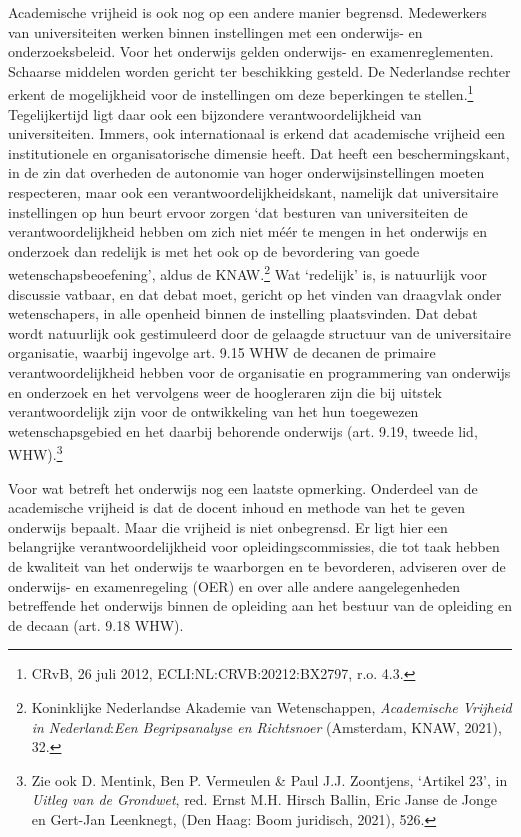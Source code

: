 \documentclass[smallauthor, chapterhaspagenum, nochapterinheader, pagenuminheader,  bigchapnum,medium2, tocpages,  garamond, titleinheader]{jote-book}
\begin{document}
	Academische vrijheid is ook nog op een andere manier begrensd. Medewerkers van universiteiten werken binnen instellingen met een onderwijs- en onderzoeksbeleid. Voor het onderwijs gelden onderwijs- en examenreglementen. Schaarse middelen worden gericht ter beschikking gesteld. De Nederlandse rechter erkent de mogelijkheid voor de instellingen om deze beperkingen te stellen.\footnote{CRvB, 26 juli 2012, ECLI:NL:CRVB:20212:BX2797, r.o. 4.3.} Tegelijkertijd ligt daar ook een bijzondere verantwoordelijkheid van universiteiten. Immers, ook internationaal is erkend dat academische vrijheid een institutionele en organisatorische dimensie heeft. Dat heeft een beschermingskant, in de zin dat overheden de autonomie van hoger onderwijsinstellingen moeten respecteren, maar ook een verantwoordelijkheidskant, namelijk dat universitaire instellingen op hun beurt ervoor zorgen ‘dat besturen van universiteiten de verantwoordelijkheid hebben om zich niet méér te mengen in het onderwijs en onderzoek dan redelijk is met het ook op de bevordering van goede wetenschapsbeoefening', aldus de KNAW.\footnote{Koninklijke Nederlandse Akademie van Wetenschappen, \emph{Academische Vrijheid in }\emph{Nederland}:\emph{Een}\emph{ Begripsanalyse en Richtsnoer}\emph{ }(Amsterdam, KNAW, 2021), 32.} Wat ‘redelijk' is, is natuurlijk voor discussie vatbaar, en dat debat moet, gericht op het vinden van draagvlak onder wetenschapers, in alle openheid binnen de instelling plaatsvinden. Dat debat wordt natuurlijk ook gestimuleerd door de gelaagde structuur van de universitaire organisatie, waarbij ingevolge art. 9.15 WHW de decanen de primaire verantwoordelijkheid hebben voor de organisatie en programmering van onderwijs en onderzoek en het vervolgens weer de hoogleraren zijn die bij uitstek verantwoordelijk zijn voor de ontwikkeling van het hun toegewezen wetenschapsgebied en het daarbij behorende onderwijs (art. 9.19, tweede lid, WHW).\footnote{Zie ook D. Mentink, Ben P. Vermeulen \& Paul J.J. Zoontjens, ‘Artikel 23', in \emph{Uitleg van de Grondwet}, red. Ernst M.H. Hirsch Ballin, Eric Janse de Jonge en Gert-Jan Leenknegt, (Den Haag: Boom juridisch, 2021), 526.}



	Voor wat betreft het onderwijs nog een laatste opmerking. Onderdeel van de academische vrijheid is dat de docent inhoud en methode van het te geven onderwijs bepaalt. Maar die vrijheid is niet onbegrensd. Er ligt hier een belangrijke verantwoordelijkheid voor opleidingscommissies, die tot taak hebben de kwaliteit van het onderwijs te waarborgen en te bevorderen, adviseren over de onderwijs- en examenregeling (OER) en over alle andere aangelegenheden betreffende het onderwijs binnen de opleiding aan het bestuur van de opleiding en de decaan (art. 9.18 WHW).
\end{document}
